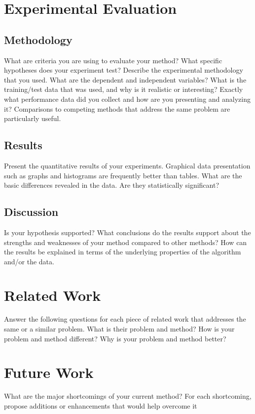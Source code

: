 \documentclass[11pt]{article}
\begin{document}
\begin{multicols}{2}
\section{Experimental Evaluation}
\subsection{Methodology}
What are criteria you are using to evaluate your method? What specific hypotheses does your experiment test? Describe the experimental methodology that you used. What are the dependent and independent variables? What is the training/test data that was used, and why is it realistic or interesting? Exactly what performance data did you collect and how are you presenting and analyzing it? Comparisons to competing methods that address the same problem are particularly useful. 

\subsection{Results}
Present the quantitative results of your experiments. Graphical data presentation such as graphs and histograms are frequently better than tables. What are the basic differences revealed in the data. Are they statistically significant?

\subsection{Discussion}
Is your hypothesis supported? What conclusions do the results support about the strengths and weaknesses of your method compared to other methods? How can the results be explained in terms of the underlying properties of the algorithm and/or the data.

\section{Related Work}
Answer the following questions for each piece of related work that addresses the same or a similar problem. What is their problem and method? How is your problem and method different? Why is your problem and method better?

\section{Future Work}
What are the major shortcomings of your current method? For each shortcoming, propose additions or enhancements that would help overcome it


\end{multicols}
\end{document}
